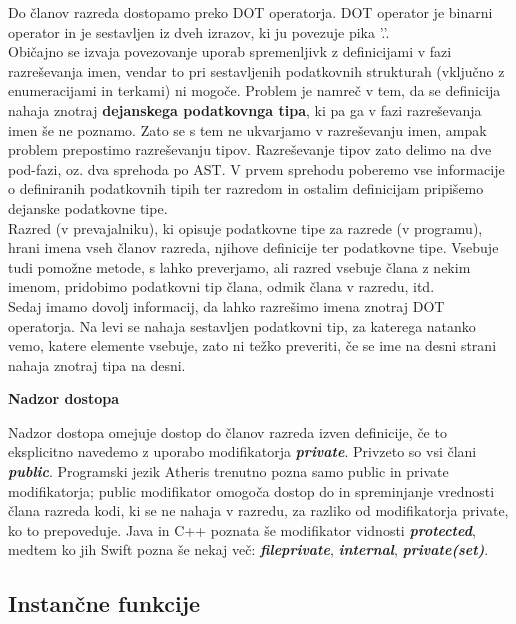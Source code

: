 \documentclass[a4paper, 12pt]{book}
\begin{document}
Do članov razreda dostopamo preko DOT operatorja. DOT operator je binarni operator in je sestavljen iz dveh izrazov, ki ju povezuje pika '.'. \\
\indent Običajno se izvaja povezovanje uporab spremenljivk z definicijami v fazi razreševanja imen, vendar to pri sestavljenih podatkovnih strukturah (vključno z enumeracijami in terkami) ni mogoče. Problem je namreč v tem, da se definicija nahaja znotraj \textbf{dejanskega podatkovnga tipa}, ki pa ga v fazi razreševanja imen še ne poznamo. Zato se s tem ne ukvarjamo v razreševanju imen, ampak problem prepostimo razreševanju tipov. Razreševanje tipov zato delimo na dve pod-fazi, oz. dva sprehoda po AST. V prvem sprehodu poberemo vse informacije o definiranih podatkovnih tipih ter razredom in ostalim definicijam pripišemo dejanske podatkovne tipe. \\
\indent Razred (v prevajalniku), ki opisuje podatkovne tipe za razrede (v programu), hrani imena vseh članov razreda, njihove definicije ter podatkovne tipe. Vsebuje tudi pomožne metode, s lahko preverjamo, ali razred vsebuje člana z nekim imenom, pridobimo podatkovni tip člana, odmik člana v razredu, itd. \\
\indent Sedaj imamo dovolj informacij, da lahko razrešimo imena znotraj DOT operatorja. Na levi se nahaja sestavljen podatkovni tip, za katerega natanko vemo, katere elemente vsebuje, zato ni težko preveriti, če se ime na desni strani nahaja znotraj tipa na desni.

\textbf{Nadzor dostopa}

Nadzor dostopa omejuje dostop do članov razreda izven definicije, če to eksplicitno navedemo z uporabo modifikatorja \textit{\textbf{private}}. Privzeto so vsi člani \textit{\textbf{public}}. Programski jezik Atheris trenutno pozna samo public in private modifikatorja; public modifikator omogoča dostop do in spreminjanje vrednosti člana razreda kodi, ki se ne nahaja v razredu, za razliko od modifikatorja private, ko to prepoveduje. Java in C++ poznata še modifikator vidnosti  \textbf{\textit{protected}}, medtem ko jih Swift pozna še nekaj več: \textbf{\textit{fileprivate}}, \textbf{\textit{internal}}, \textbf{\textit{private(set)}}.

\subsection{Instančne funkcije}
\end{document}
